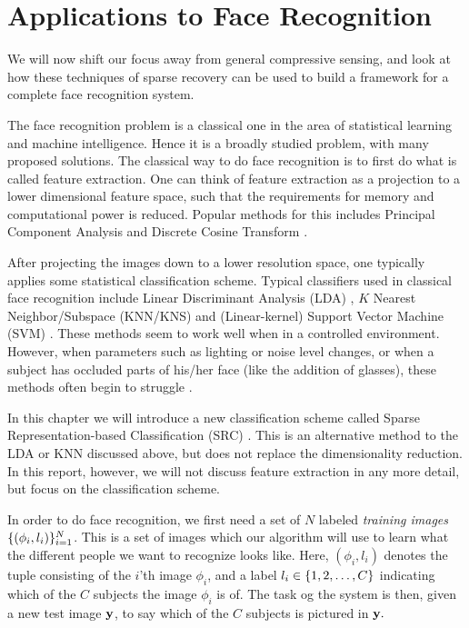 \chapter{Applications to Face Recognition}
We will now shift our focus away from general compressive sensing, and look at how these techniques of sparse recovery can be used to build a framework for a complete face recognition system. 

The face recognition problem is a classical one in the area of statistical learning and machine intelligence. Hence it is a broadly studied problem, with many proposed solutions. The classical way to do face recognition is to first do what is called feature extraction. One can think of feature extraction as a projection to a lower dimensional feature space, such that the requirements for memory and computational power is reduced. Popular methods for this includes Principal Component Analysis and Discrete Cosine Transform \cite{bhat2014performance}.

After projecting the images down to a lower resolution space, one typically applies some statistical classification scheme. Typical classifiers used in classical face recognition include  Linear Discriminant Analysis (LDA) \cite{bhat2014performance}, $ K $ Nearest Neighbor/Subspace (KNN/KNS) \cite{lee2005acquiring} and (Linear-kernel) Support Vector Machine (SVM) \cite{wright09facerecog}. These methods seem to work well when in a controlled environment. However, when parameters such as lighting or noise level changes, or when a subject has occluded parts of his/her face (like the addition of glasses), these methods often begin to struggle \cite{eldar12theoryapplic}.

In this chapter we will introduce a new classification scheme called Sparse Representation-based Classification (SRC) \cite{wright09facerecog}. This is an alternative method to the LDA or KNN discussed above, but does not replace the dimensionality reduction. In this report, however, we will not discuss feature extraction in any more detail, but focus on the classification scheme. 

In order to do face recognition, we first need a set of $ N $ labeled \textit{training images} $ \{(\phi_{i}, l_{i})\}_{i=1}^{N} $. This is a set of images which our algorithm will use to learn what the different people we want to recognize looks like. Here, $ (\phi_{i}, l_{i}) $ denotes the tuple consisting of the $ i $'th image $ \phi_{i} $, and a label $ l_{i} \in \{1, 2, \ldots, C\} $ indicating which of the $ C $ subjects the image $ \phi_{i} $ is of. The task og the system is then, given a new test image $ \mathbf{y} $, to say which of the $ C $ subjects is pictured in $ \mathbf{y}. $




